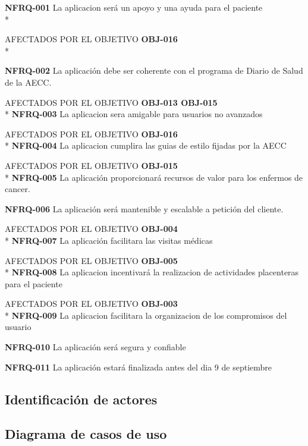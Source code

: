 \documentclass[../pfc.tex]{subfiles}
\begin{document}
	\textbf{NFRQ-001}		La aplicacion será un apoyo y una ayuda para el paciente\\*
	
	
	AFECTADOS POR EL OBJETIVO 	\textbf{OBJ-016}\\*
		
	\textbf{NFRQ-002}		La aplicación debe ser coherente con el programa de Diario de Salud de la AECC.
	
	
	AFECTADOS POR EL OBJETIVO 	\textbf{OBJ-013 OBJ-015}\\*		
	\textbf{NFRQ-003}		La aplicacion sera amigable para usuarios no avanzados
	
	
	AFECTADOS POR EL OBJETIVO 	\textbf{OBJ-016}\\*	
	\textbf{NFRQ-004}		La aplicacion cumplira las guias de estilo fijadas por la AECC
	
	
	AFECTADOS POR EL OBJETIVO 	\textbf{OBJ-015}\\*		
	\textbf{NFRQ-005}		La aplicación proporcionará recursos de valor para los enfermos de cancer.
	
	
		
	\textbf{NFRQ-006}		La aplicación será mantenible y escalable a petición del cliente.


	AFECTADOS POR EL OBJETIVO 	\textbf{OBJ-004}\\*	
	\textbf{NFRQ-007}		La aplicación facilitara las visitas médicas


	AFECTADOS POR EL OBJETIVO 	\textbf{OBJ-005}\\*			
	\textbf{NFRQ-008}		La aplicacion incentivará la realizacion de actividades placenteras para el paciente


	AFECTADOS POR EL OBJETIVO 	\textbf{OBJ-003}\\*		
	\textbf{NFRQ-009}		La aplicacion facilitara la organizacion de los compromisos del usuario


		
	\textbf{NFRQ-010}		La aplicación será segura y confiable
	
	
	\textbf{NFRQ-011}		La aplicación estará finalizada antes del dia 9 de septiembre


		
	

	\subsection{Identificación de actores}
		
	\subsection{Diagrama de casos de uso }
		
\end{document}

